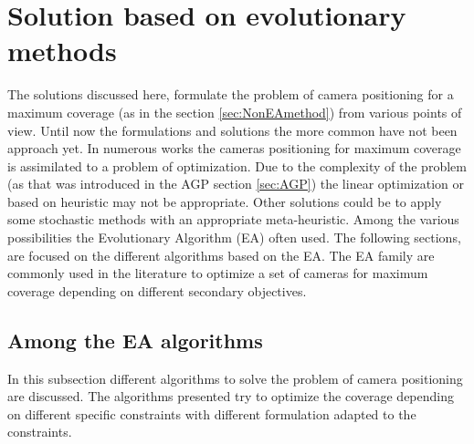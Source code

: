 	
	\section{Solution based on evolutionary  methods} \label{sec:SolutionBasedonEA}
	
	The solutions discussed here, formulate the problem of camera positioning for a maximum coverage (as in the section \ref{sec:NonEAmethod}) from various points of view. Until now the formulations and solutions the more common have not been approach yet.
In numerous works the cameras positioning for maximum coverage is assimilated to a problem of optimization. Due to the complexity of the problem (as that was introduced in the AGP section \ref{sec:AGP}) the linear optimization or based on heuristic may not be appropriate.  
Other solutions could be to apply some stochastic methods with an appropriate meta-heuristic. Among the various possibilities the Evolutionary Algorithm (EA) often used. 
The following sections, are focused on the different algorithms  based on the EA. The EA family are commonly used in the literature to optimize a set of cameras for maximum coverage depending on different secondary objectives.

\subsection{Among the EA algorithms}
In this subsection different algorithms to solve the problem of camera positioning are discussed. The algorithms presented try to optimize the coverage depending on different specific constraints with different formulation adapted to the constraints.

